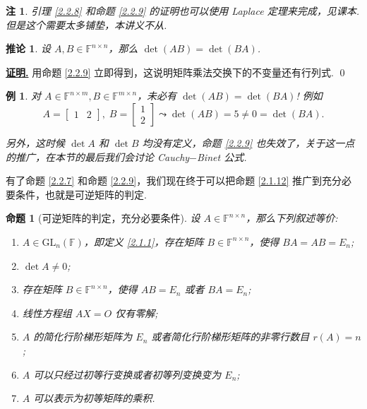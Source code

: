 \documentclass[10pt,openany]{article}
\theoremstyle{thmstyle} %
\theoremstyle{defstyle} %
\newtheorem{corollary}[theorem]{推论}
\theoremstyle{prostyle} %
\newtheorem{proposition}[theorem]{命题}
\theoremstyle{exastyle}
\newtheorem{example}[theorem]{例}
\theoremstyle{remstyle}
\newtheorem{remark}[theorem]{注}
\renewenvironment{proof}[1][证明]{\par\underline{\textbf{#1.}} \;\fangsong}{\qed\par}
\newcommand{\F}{\mathbb{F}}
\newcommand{\gf}{\text{GL}_n(\mathbb{F})}
\newcommand{\n}{^{n \times n}}
\newcommand{\mn}{^{m \times n}}
\newcommand{\nm}{^{n \times m}}
\begin{document}
\begin{remark}
	引理 \ref{2.2.8} 和命题 \ref{2.2.9} 的证明也可以使用 Laplace 定理来完成，见课本. 但是这个需要太多铺垫，本讲义不从.
\end{remark}

\begin{corollary}
	设 \( A,B \in \F\n \)，那么 \( \det(AB)=\det(BA) \).
\end{corollary}

\begin{proof}
	用命题 \ref{2.2.9} 立即得到，这说明矩阵乘法交换下的不变量还有行列式.
\end{proof}

\begin{example}
	对 \( A \in \F\nm, B \in \F\mn \)，未必有 \( \det(AB)=\det(BA) \)! 例如
	\[ A= \begin{bmatrix}
		1 & 2
	\end{bmatrix}, \; B=\begin{bmatrix}
	1 \\ 2
	\end{bmatrix} \leadsto \det(AB)=5 \neq 0=\det(BA). \]
	
	 另外，这时候 \( \det A \) 和 \( \det B \) 均没有定义，命题 \ref{2.2.9} 也失效了，关于这一点的推广，在本节的最后我们会讨论 Cauchy\(-\)Binet 公式.
\end{example}

有了命题 \ref{2.2.7} 和命题 \ref{2.2.9}，我们现在终于可以把命题 \ref{2.1.12} 推广到充分必要条件，也就是可逆矩阵的判定.

\begin{proposition}[可逆矩阵的判定，充分必要条件]	\label{2.2.13}
	设 \( A \in \F\n \)，那么下列叙述等价:
	\begin{enumerate}[(1)]
		\item \( A \in \gf \)，即定义 \ref{2.1.1}，存在矩阵 \( B \in \F\n \)，使得 \( BA=AB=E_n \);
		\item \( \det A \neq 0 \);
		\item 存在矩阵 \( B \in \F\n \)，使得 \( AB=E_n \) 或者 \( BA=E_n \);
		\item 线性方程组 \( AX=O \) 仅有零解;
		\item \( A \) 的简化行阶梯形矩阵为 \( E_n \) 或者简化行阶梯形矩阵的非零行数目 \( r(A)=n \);
		\item \( A \) 可以只经过初等行变换或者初等列变换变为 \( E_n \);
		\item \( A \) 可以表示为初等矩阵的乘积.
	\end{enumerate}

\end{proposition}
\end{document}
